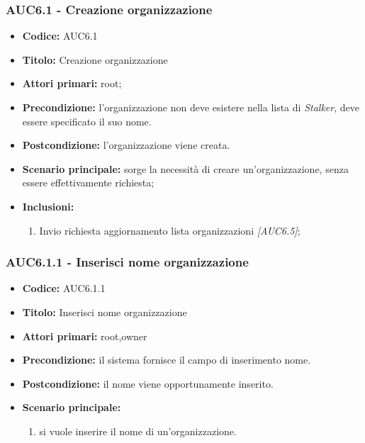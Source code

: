 \documentclass[casi-duso]{subfiles}
\begin{document}
  \subsubsection{AUC6.1 - Creazione organizzazione}%
  \label{subsub:AUC6.1}
  \begin{itemize}
    \item \textbf{Codice:} AUC6.1
    \item \textbf{Titolo:} Creazione organizzazione
    \item \textbf{Attori primari:} root;
    \item \textbf{Precondizione:} l'organizzazione non deve esistere nella lista di \emph{Stalker}, deve essere specificato il suo nome.
    \item \textbf{Postcondizione:} l'organizzazione viene creata.
    \item \textbf{Scenario principale:} sorge la necessità di creare un'organizzazione, senza essere effettivamente richiesta;
    \item \textbf{Inclusioni:}
    \begin{enumerate}
      \item Invio richiesta aggiornamento lista organizzazioni \emph{[AUC6.5]};
    \end{enumerate}
  \end{itemize}

  \subsubsection{AUC6.1.1 - Inserisci nome organizzazione}%
  \label{subsub:AUC6.1.1}
  \begin{itemize}
    \item \textbf{Codice:} AUC6.1.1
    \item \textbf{Titolo:} Inserisci nome organizzazione
    \item \textbf{Attori primari:} root,owner
    \item \textbf{Precondizione:} il sistema fornisce il campo di inserimento nome.
    \item \textbf{Postcondizione:} il nome viene opportunamente inserito.
    \item \textbf{Scenario principale:} 
    \begin{enumerate}
      \item si vuole inserire il nome di un'organizzazione.
    \end{enumerate}
    
  \end{itemize}
  
\end{document}
